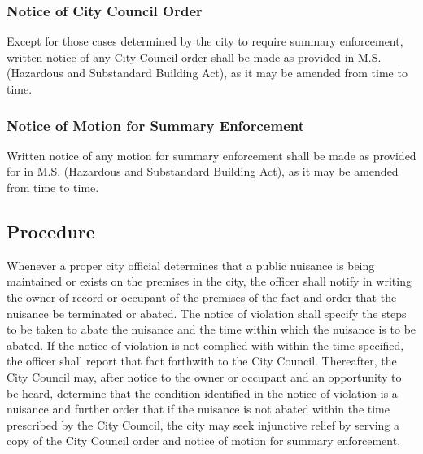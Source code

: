 \documentclass[code.tex]{subfiles}
\begin{document}
\subsubsection{Notice of City Council Order}
Except for those cases determined by the city to require summary enforcement, written notice of any City Council order shall be made as provided in M.S.  (Hazardous and Substandard Building Act), as it may be amended from time to time.
\subsubsection{Notice of Motion for Summary Enforcement}
Written notice of any motion for summary enforcement shall be made as provided for in M.S.  (Hazardous and Substandard Building Act), as it may be amended from time to time.
\subsection{Procedure}
Whenever a proper city official determines that a public nuisance is being maintained or exists on the premises in the city, the officer shall notify in writing the owner of record or occupant of the premises of the fact and order that the nuisance be terminated or abated.  The notice of violation shall specify the steps to be taken to abate the nuisance and the time within which the nuisance is to be abated.  If the notice of violation is not complied with within the time specified, the officer shall report that fact forthwith to the City Council.  Thereafter, the City Council may, after notice to the owner or occupant and an opportunity to be heard, determine that the condition identified in the notice of violation is a nuisance and further order that if the nuisance is not abated within the time prescribed by the City Council, the city may seek injunctive relief by serving a copy of the City Council order and notice of motion for summary enforcement.
\end{document}
